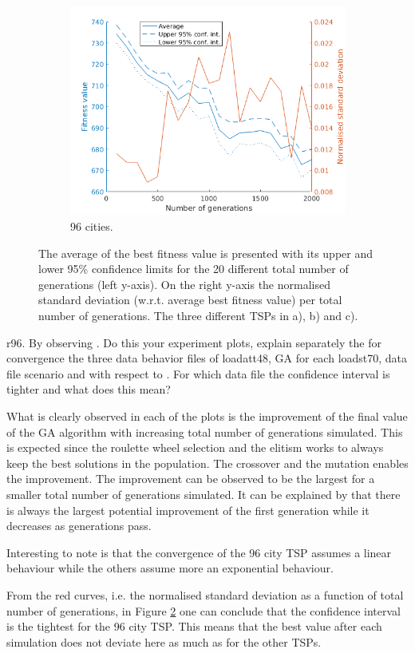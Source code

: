 \documentclass[]{article}
\begin{document}
\begin{figure}[H]
  \begin{subfigure}{\textwidth}
     \centering
     \includegraphics[width=0.5\linewidth]{../GA_TSP/t296.png}
     \caption{96 cities.}
     \label{sfig:t296}
  \end{subfigure}%
\caption{The average of the best fitness value is presented with its upper and lower 95\% confidence limits for the 20 different total number of generations (left y-axis). On the right y-axis the normalised standard deviation (w.r.t. average best fitness value) per total number of generations. The three different TSPs in a), b) and c).}
  \label{fig:task2}
\end{figure}
r96.  By observing . Do this your experiment plots, explain separately the for convergence the three data behavior files of loadatt48, GA for each loadst70,
 data
 file scenario and with respect to
  . For which data file the confidence interval is tighter
  and what does this mean?

What is clearly observed in each of the plots is the improvement of the final value of the GA algorithm with increasing total number of generations simulated.
This is expected since the roulette wheel selection and the elitism works to always keep the best solutions in the population.
The crossover and the mutation enables the improvement.
The improvement can be observed to be the largest for a smaller total number of generations simulated.
It can be explained by that there is always the largest potential improvement of the first generation while it decreases as generations pass.

Interesting to note is that the convergence of the 96 city TSP assumes a linear behaviour while the others assume more an exponential behaviour.

From the red curves, i.e. the normalised standard deviation as a function of total number of generations, in Figure \ref{fig:task2} one can conclude that the confidence interval is the tightest for the 96 city TSP.
This means that the best value after each simulation does not deviate here as much as for the other TSPs.
\end{document}

